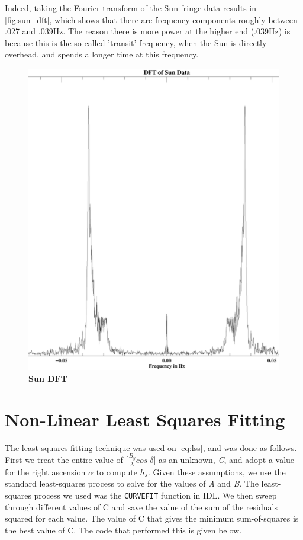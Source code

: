 \documentclass{article}
\begin{document}
Indeed, taking the Fourier transform of the Sun fringe data results in \autoref{fig:sun_dft}, which shows that there are frequency components roughly between .027 and .039Hz. The reason there is more power at the higher end (.039Hz) is because this is the so-called 'transit' frequency, when the Sun is directly overhead, and spends a longer time at this frequency.


\begin{figure}[h!]
 \begin{center}
    \includegraphics[width=6.5in]{sun_dft.ps}
    \caption{\bf{Sun DFT}}
    \label{fig:sun_dft}
     \end{center}
    \end{figure}
    
    
\section{Non-Linear Least Squares Fitting}

The least-squares fitting technique was used on \autoref{eq:lss}, and was done as follows. First we treat the entire value of $\bigg[ \frac{B_y}{\lambda}cos\;\delta \bigg]$ as an unknown, \textit{C}, and adopt a value for the right ascension $\alpha$ to compute $h_s$. Given these assumptions, we use the standard least-squares process to solve for the values of \textit{A} and \textit{B}. The least-squares process we used was the \texttt{CURVEFIT} function in IDL. We then sweep through different values of C and save the value of the sum of the residuals squared for each value. The value of C that gives the minimum sum-of-squares is the best value of C. The code that performed this is given below. 
\end{document}
